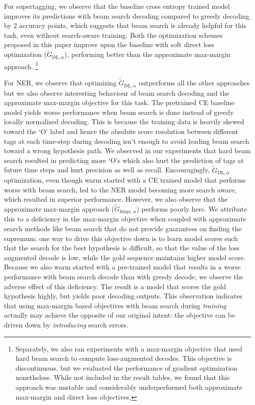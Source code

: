 \documentclass[letterpaper]{article} \usepackage{aaai18}  \usepackage{times}  \usepackage{helvet}  \usepackage{courier}  \usepackage{url}  \usepackage{graphicx}  \frenchspacing
\begin{document}
For supertagging, we observe that the baseline cross entropy trained model improves its predictions with  beam search decoding compared to greedy decoding by 2 accuracy points, which suggests that beam search is already helpful for this task, even without search-aware training. Both the optimization schemes proposed in this paper improve upon the baseline with soft direct loss optimization ($\tilde{G}_{\textrm{DL},\alpha}$), performing better than the approximate max-margin approach. \footnote{Separately, we also ran experiments with a max-margin objective that used hard beam search to compute loss-augmented decodes. This objective is discontinuous, but we evaluated the performance of gradient optimization nonetheless. While not included in the result tables, we found that this approach was unstable and considerably underperformed both approximate max-margin and 
direct loss objectives.} 

For NER, we observe that optimizing $\tilde{G}_{\textrm{DL},\alpha}$ outperforms all the other approaches but we also observe interesting behaviour of beam search decoding and the approximate max-margin objective for this task. The pretrained CE baseline model yields worse performance when beam search is done instead of greedy locally normalized decoding. This is because the training data is heavily skewed toward the `O' label and hence the absolute score resolution between different tags at each time-step during decoding isn't enough to avoid leading beam search toward a wrong hypothesis path. We observed in our experiments that hard beam search resulted in predicting more `O's which also hurt the prediction of tags at future time steps and hurt precision as well as recall. Encouragingly, $\tilde{G}_{\textrm{DL},\alpha}$ optimization, even though warm started with a CE trained model that performs worse with beam search, led to the NER model becoming more search aware, which resulted in superior performance. However, we also observe that the approximate max-margin approach ($\tilde{G}_{\textrm{hinge},\alpha}$) performs poorly here. We attribute this to a deficiency in the max-margin objective when coupled with approximate search methods like beam search that do not provide guarantees on finding the supremum: one way to drive this objective down is to learn model scores such that the search for the best hypothesis is difficult, so that the value of the loss augmented decode is low, while the gold sequence maintains higher model score. Because we also warm started with a pre-trained model that results in a worse performance with beam search decode than with greedy decode, we observe the adverse effect of this deficiency. The result is a model that scores the gold hypothesis highly, but yields poor decoding outputs. This observation indicates that using max-margin based objectives with beam search during \emph{training} actually may achieve the opposite of our original intent: the objective can be driven down by \emph{introducing} search errors.
\end{document}
